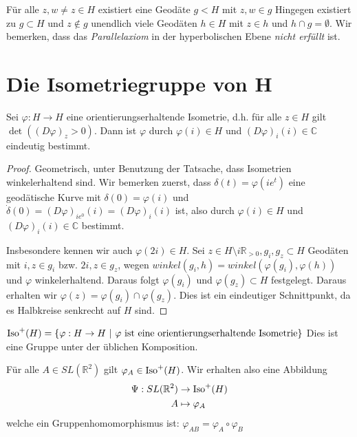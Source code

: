 \documentclass[../main.tex]{subfiles}
\begin{document}
\begin{remark}
    Für alle $z, w \not = z \in H$ existiert eine Geodäte $g < H$ mit $z,w \in g$
    Hingegen existiert zu $g \subset H$ und $z \not \in g$ unendlich viele Geodäten $h \in H$ mit $z \in h$ und $h \cap g = \emptyset$.
    Wir bemerken, dass das \emph{Parallelaxiom} in der hyperbolischen Ebene \emph{nicht erfüllt} ist.
\end{remark}

\section{Die Isometriegruppe von H}
\begin{lemma}
    Sei $\varphi : H \to H$ eine orientierungserhaltende Isometrie,
    d.h. für alle $z \in H$ gilt $\det \left ((D\varphi)_z > 0 \right )$. Dann ist $\varphi$ durch
    $\varphi (i) \in H$ und $(D\varphi)_i(i) \in \mathbb{C}$ eindeutig bestimmt.
\end{lemma}
\begin{proof}
    Geometrisch, unter Benutzung der Tatsache, dass Isometrien winkelerhaltend sind. Wir bemerken zuerst,
    dass $\delta (t) = \varphi (ie^t)$ eine geodätische Kurve mit $\delta (0) = \varphi (i)$ und
    $\dot {\delta}(0) = (D\varphi)_{ie^0}(i)= (D\varphi)_i(i)$ ist, also durch $\varphi (i) \in H$ und $(D\varphi)_i(i) \in \mathbb{C}$ bestimmt.

    Insbesondere kennen wir auch $\varphi (2i)\in H$.
    Sei $z \in H \setminus i\mathbb{R}_{>0}, g_i, g_z \subset H$ Geodäten mit $i,z \in g_i$
    bzw. $2 i, z \in g_z$, wegen $winkel (g_i,h) = winkel(\varphi (g_i), \varphi (h)) $ und $\varphi$ winkelerhaltend.
    Daraus folgt $\varphi (g_i)$ und $\varphi (g_z) \subset H$ festgelegt. Daraus erhalten wir $\varphi (z) = \varphi (g_i) \cap \varphi (g_z)$.
    Dies ist ein eindeutiger Schnittpunkt, da es Halbkreise senkrecht auf $H$ sind.
\end{proof}

\begin{definition}
    $\Iso ^+ (H) = \{ \varphi : H \to H \ | \ \varphi \text{ ist eine orientierungserhaltende Isometrie}\}$ 
    Dies ist eine Gruppe unter der üblichen Komposition.
\end{definition}
Für alle $A \in SL(\mathbb{R}^2)$ gilt $\varphi _A \in \operatorname{Iso}^+ (H)$.
Wir erhalten also eine Abbildung
\begin{align*}
    \Psi : SL(\mathbb{R}^2) &\to \operatorname{Iso} ^+(H) \\
    A &\mapsto \varphi _A 
\end{align*} welche ein Gruppenhomomorphismus ist: $\varphi _{AB} = \varphi _A \circ \varphi_B$
\end{document}
